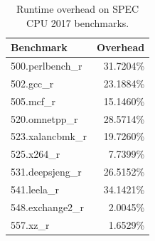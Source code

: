 \begin{table}[t]
\centering
\begin{tabular}{lr}
\toprule
\textbf{Benchmark} & \textbf{Overhead} \\
\midrule
500.perlbench\_r & 31.7204\% \\
502.gcc\_r       & 23.1884\% \\
505.mcf\_r       & 15.1460\% \\
520.omnetpp\_r   & 28.5714\% \\
523.xalancbmk\_r & 19.7260\% \\
525.x264\_r      & 7.7399\%  \\
531.deepsjeng\_r & 26.5152\% \\
541.leela\_r     & 34.1421\% \\
548.exchange2\_r & 2.0045\%  \\
557.xz\_r        & 1.6529\%  \\
\bottomrule
\end{tabular}
\caption{Runtime overhead on SPEC CPU 2017 benchmarks.}
\label{tab:overhead}
\end{table}